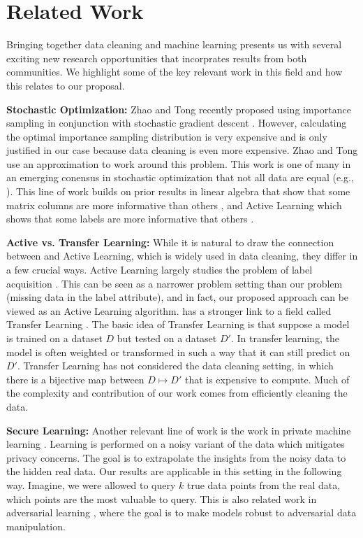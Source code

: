 \section{Related Work}
Bringing together data cleaning and machine learning presents us with several exciting new research opportunities that incorprates results from both communities.
We highlight some of the key relevant work in this field and how this relates to our proposal.

\noindent \textbf{Stochastic Optimization: } Zhao and Tong recently proposed using importance sampling in conjunction with stochastic gradient descent \cite{zhao2014stochastic}. However, calculating the optimal importance sampling distribution is very expensive and is only justified in our case because data cleaning is even more expensive. Zhao and Tong use an approximation to work around this problem. This work is one of many in an emerging conensus in stochastic optimization that not all data are equal (e.g., \cite{qu2014randomized}). This line of work builds on prior results in linear algebra that show that some matrix columns are more informative than others \cite{rineas2012fast}, and Active Learning which shows that some labels are more informative that others \cite{settles2010active}.

\noindent \textbf{Active vs. Transfer Learning: } While it is natural to draw the connection between \sys and Active Learning, which is widely used in data cleaning, they differ in a few crucial ways. 
Active Learning largely studies the problem of label acquisition \cite{settles2010active}.
This can be seen as a narrower problem setting than our problem (missing data in the label attribute), and in fact, our proposed approach can be viewed as an Active Learning algorithm.
\sys has a stronger link to a field called Transfer Learning \cite{pan2010survey}. The basic idea of Transfer Learning is that suppose a model is trained on a dataset $D$ but tested on a dataset $D'$. In transfer learning, the model is often weighted or transformed in such a way that it can still predict on $D'$. Transfer Learning has not considered the data cleaning setting, in which there is a bijective map between $D \mapsto D'$ that is expensive to compute. Much of the complexity and contribution of our work comes from efficiently cleaning the data.

\noindent \textbf{Secure Learning: } Another relevant line of work is the work in private machine learning  \cite{wainwright2012privacy, duchi2013local}. Learning is performed on a noisy variant of the data which mitigates privacy concerns. The goal is to extrapolate the insights from the noisy data to the hidden real data. Our results are applicable in this setting in the following way. Imagine, we were allowed to query $k$ true data points from the real data, which points are the most valuable to query. This is also related work in adversarial learning \cite{nelson2012query}, where the goal is to make models robust to adversarial data manipulation.

